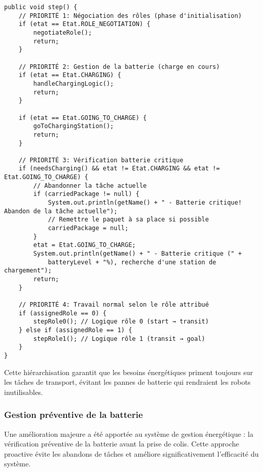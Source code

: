 \documentclass[12pt,a4paper]{article}
\begin{document}
\begin{lstlisting}[caption=Logique de priorité dans la méthode step()]
public void step() {
    // PRIORITÉ 1: Négociation des rôles (phase d'initialisation)
    if (etat == Etat.ROLE_NEGOTIATION) {
        negotiateRole();
        return;
    }

    // PRIORITÉ 2: Gestion de la batterie (charge en cours)
    if (etat == Etat.CHARGING) {
        handleChargingLogic();
        return;
    }

    if (etat == Etat.GOING_TO_CHARGE) {
        goToChargingStation();
        return;
    }

    // PRIORITÉ 3: Vérification batterie critique
    if (needsCharging() && etat != Etat.CHARGING && etat != Etat.GOING_TO_CHARGE) {
        // Abandonner la tâche actuelle
        if (carriedPackage != null) {
            System.out.println(getName() + " - Batterie critique! Abandon de la tâche actuelle");
            // Remettre le paquet à sa place si possible
            carriedPackage = null;
        }
        etat = Etat.GOING_TO_CHARGE;
        System.out.println(getName() + " - Batterie critique (" +
            batteryLevel + "%), recherche d'une station de chargement");
        return;
    }

    // PRIORITÉ 4: Travail normal selon le rôle attribué
    if (assignedRole == 0) {
        stepRole0(); // Logique rôle 0 (start → transit)
    } else if (assignedRole == 1) {
        stepRole1(); // Logique rôle 1 (transit → goal)
    }
}
\end{lstlisting}

Cette hiérarchisation garantit que les besoins énergétiques priment toujours sur les tâches de transport, évitant les pannes de batterie qui rendraient les robots inutilisables.

\subsubsection{Gestion préventive de la batterie}

Une amélioration majeure a été apportée au système de gestion énergétique : la vérification préventive de la batterie avant la prise de colis. Cette approche proactive évite les abandons de tâches et améliore significativement l'efficacité du système.
\end{document}
